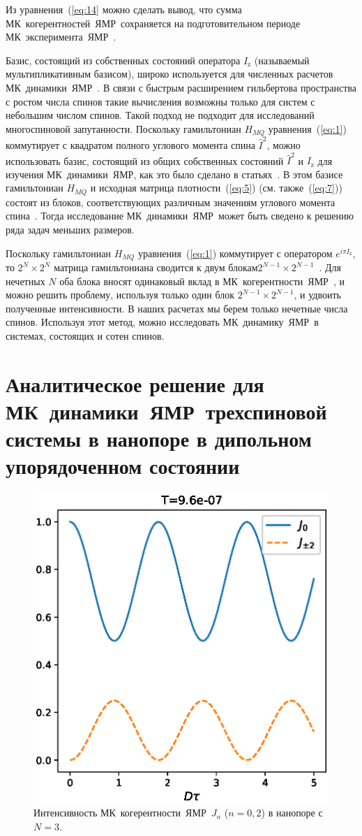 \documentclass[utf8]{jetp}
\begin{document}
%
Из уравнения~(\ref{eq:14} можно сделать вывод, что сумма МК~когерентностей~ЯМР~сохраняется на подготовительном периоде МК~эксперимента~ЯМР~\cite{Baum_1985}.

Базис, состоящий из собственных состояний оператора $I_\mathrm{z}$ (называемый мультипликативным базисом), широко используется для численных расчетов МК~динамики~ЯМР~\cite{Zhang_2009}.
В связи с быстрым расширением гильбертова пространства с ростом числа спинов такие вычисления возможны только для систем с небольшим числом спинов.
Такой подход не подходит для исследований многоспиновой запутанности.
Поскольку гамильтониан $H_{MQ}$ уравнения~(\ref{eq:1}) коммутирует с квадратом полного углового момента спина $\hat I^2$,
можно использовать базис, состоящий из общих собственных состояний $\hat I^2$ и $I_\mathrm{z}$ для изучения МК~динамики~ЯМР, как это было сделано в статьях~\cite{Doronin_2009,Doronin_2011,Doronin_2019}.
В этом базисе гамильтониан $H_{MQ}$ и исходная матрица плотности~(\ref{eq:5}) (см. также~(\ref{eq:7})) состоят из блоков, соответствующих различным значениям углового момента спина~\cite{Doronin_2009}.
Тогда исследование МК~динамики~ЯМР~может быть сведено к решению ряда задач меньших размеров.

Поскольку гамильтониан $H_{MQ}$ уравнения~(\ref{eq:1}) коммутирует с оператором $e^{i\pi I_\mathrm{z}}$, то $2^N \times 2^N$ матрица гамильтониана сводится к двум блокам$2^{N-1} \times 2^{N-1}$~\cite{Doronin_2009}.
Для нечетных $N$ оба блока вносят одинаковый вклад в МК~когерентности~ЯМР~, и можно решить проблему, используя только один блок $2^{N-1} \times 2^{N-1}$, и удвоить полученные интенсивности.
В наших расчетах мы берем только нечетные числа спинов.
Используя этот метод, можно исследовать МК~динамику~ЯМР~в системах, состоящих и сотен спинов.

\section{Аналитическое решение для МК~динамики~ЯМР~трехспиновой системы в нанопоре в дипольном упорядоченном состоянии}
\label{sec:3}

\begin{figure}
  \centering
 	\includegraphics[width=0.5\linewidth]{coherences_n3_beta5.eps}
	\caption{
	  Интенсивность МК~когерентности~ЯМР~$J_{n}$ ($n=0, 2$) в нанопоре с $N=3$.
	}
	\label{fig:1}
\end{figure}
\end{document}
